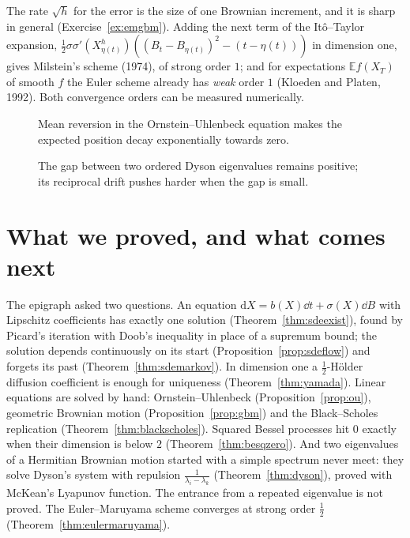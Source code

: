 The rate $\sqrt h$ for the error is the size of one Brownian increment, and it is sharp in general (Exercise~\ref{ex:emgbm}). Adding the next term of the It\^o--Taylor expansion,
$\frac12\sigma\sigma'(X^h_{\eta(t)})((B_t-B_{\eta(t)})^2-(t-\eta(t)))$ in dimension one, gives Milstein's scheme (1974), of strong order $1$; and for expectations $\mathbb Ef(X_T)$ of smooth $f$ the Euler scheme
already has \emph{weak} order $1$ (Kloeden and Platen, 1992). Both convergence orders can be measured numerically.

\begin{figure}[ht]
\centering
{}
\caption{Mean reversion in the Ornstein--Uhlenbeck equation makes the expected position decay exponentially towards zero.}
\label{fig:v12oudecay}
\end{figure}

\begin{figure}[ht]
\centering
{}
\caption{The gap between two ordered Dyson eigenvalues remains positive; its reciprocal drift pushes harder when the gap is small.}
\label{fig:v12dyson2gap}
\end{figure}

\section{What we proved, and what comes next}

The epigraph asked two questions. An equation $\mathrm dX=b(X)\dd t+\sigma(X)\dd B$ with Lipschitz coefficients has exactly one solution (Theorem~\ref{thm:sdeexist}),
found by Picard's iteration with Doob's inequality in place of a supremum bound; the solution depends continuously on its start
(Proposition~\ref{prop:sdeflow}) and forgets its past (Theorem~\ref{thm:sdemarkov}). In dimension one a $\frac12$-H\"older diffusion coefficient is enough
for uniqueness (Theorem~\ref{thm:yamada}). Linear equations are solved by hand: Ornstein--Uhlenbeck (Proposition~\ref{prop:ou}), geometric Brownian motion
(Proposition~\ref{prop:gbm}) and the Black--Scholes replication (Theorem~\ref{thm:blackscholes}). Squared Bessel processes hit $0$ exactly when their
dimension is below $2$ (Theorem~\ref{thm:besqzero}). And two eigenvalues of a Hermitian Brownian motion started with a simple spectrum never meet: they
solve Dyson's system with repulsion $\frac1{\lambda_i-\lambda_k}$ (Theorem~\ref{thm:dyson}), proved with McKean's Lyapunov function. The entrance from a
repeated eigenvalue is not proved. The Euler--Maruyama scheme converges at strong order $\frac12$ (Theorem~\ref{thm:eulermaruyama}).

